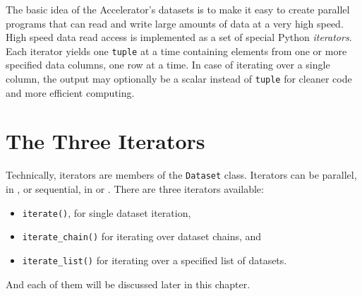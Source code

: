 
\label{chap:iterators}

The basic idea of the Accelerator's datasets is to make it easy to
create parallel programs that can read and write large amounts of data
at a very high speed.  High speed data read access is implemented as a
set of special Python \textsl{iterators}.  Each iterator yields
one \texttt{tuple} at a time containing elements from one or more
specified data columns, one row at a time.  In case of iterating over
a single column, the output may optionally be a scalar instead
of \texttt{tuple} for cleaner code and more efficient computing.



\section{The Three Iterators}
Technically, iterators are members of the \texttt{Dataset} class.
Iterators can be parallel, in \analysis, or sequential, in \prepare
or \synthesis.  There are three iterators available:
\begin{itemize}
\item [] \texttt{iterate()}, for single dataset iteration,
\item [] \texttt{iterate\_chain()} for iterating over dataset chains, and
\item [] \texttt{iterate\_list()} for iterating over a specified list of datasets.
\end{itemize}
And each of them will be discussed later in this chapter.

